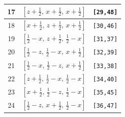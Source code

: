 \documentclass[fleqn,8pt]{jsarticle}
\begin{document}
\begin{longtable}{ccc}
17 & $\left[ z + \frac{1}{2},\, x + \frac{1}{2},\, x + \frac{1}{2} \right]$ & {\tt [29,48]} \\ \hline
18 & $\left[ x + \frac{1}{2},\, z + \frac{1}{2},\, x + \frac{1}{2} \right]$ & {\tt [30,46]} \\ \hline
19 & $\left[ \frac{1}{2} - x,\, z + \frac{1}{2},\, \frac{1}{2} - x \right]$ & {\tt [31,37]} \\ \hline
20 & $\left[ \frac{1}{2} - z,\, \frac{1}{2} - x,\, x + \frac{1}{2} \right]$ & {\tt [32,39]} \\ \hline
21 & $\left[ \frac{1}{2} - x,\, \frac{1}{2} - z,\, x + \frac{1}{2} \right]$ & {\tt [33,38]} \\ \hline
22 & $\left[ z + \frac{1}{2},\, \frac{1}{2} - x,\, \frac{1}{2} - x \right]$ & {\tt [34,40]} \\ \hline
23 & $\left[ x + \frac{1}{2},\, \frac{1}{2} - z,\, \frac{1}{2} - x \right]$ & {\tt [35,45]} \\ \hline
24 & $\left[ \frac{1}{2} - z,\, x + \frac{1}{2},\, \frac{1}{2} - x \right]$ & {\tt [36,47]} \\
\end{longtable}
\renewcommand{\arraystretch}{1.2}
\end{document}
